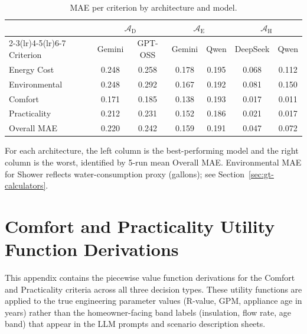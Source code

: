 \documentclass[final,3p,times]{elsarticle}
\begin{document}
\begin{table}[htbp]
\begin{threeparttable}
\small
\centering
\renewcommand{\arraystretch}{1.15}
\begin{tabular}{lcccccc}
\toprule
 & \multicolumn{2}{c}{$\mathcal{A}_{\text{D}}$} & \multicolumn{2}{c}{$\mathcal{A}_{\text{E}}$} & \multicolumn{2}{c}{$\mathcal{A}_{\text{H}}$} \\
\cmidrule(lr){2-3}\cmidrule(lr){4-5}\cmidrule(lr){6-7}
Criterion & Gemini & GPT-OSS & Gemini & Qwen & DeepSeek & Qwen \\
\midrule
Energy Cost & 0.248 & 0.258 & 0.178 & 0.195 & 0.068 & 0.112 \\
Environmental & 0.248 & 0.292 & 0.167 & 0.192 & 0.081 & 0.150 \\
Comfort & 0.171 & 0.185 & 0.138 & 0.193 & 0.017 & 0.011 \\
Practicality & 0.212 & 0.231 & 0.152 & 0.186 & 0.021 & 0.017 \\
\addlinespace
Overall MAE & 0.220 & 0.242 & 0.159 & 0.191 & 0.047 & 0.072 \\
\bottomrule
\end{tabular}
\renewcommand{\arraystretch}{1.0}
\begin{tablenotes}
\item For each architecture, the left column is the best-performing model and the right column is the worst, identified by 5-run mean Overall MAE. Environmental MAE for Shower reflects water-consumption proxy (gallons); see Section~\ref{sec:gt-calculators}.
\end{tablenotes}
\caption{MAE per criterion by architecture and model.}
\label{tab:item6}
\end{threeparttable}
\end{table}

\FloatBarrier
\section{Comfort and Practicality Utility Function Derivations}\label{app:utility_derivations}

This appendix contains the piecewise value function derivations for the Comfort and Practicality criteria across all three decision types. These utility functions are applied to the true engineering parameter values (R-value, GPM, appliance age in years) rather than the homeowner-facing band labels (insulation, flow rate, age band) that appear in the LLM prompts and scenario description sheets.
\end{document}
